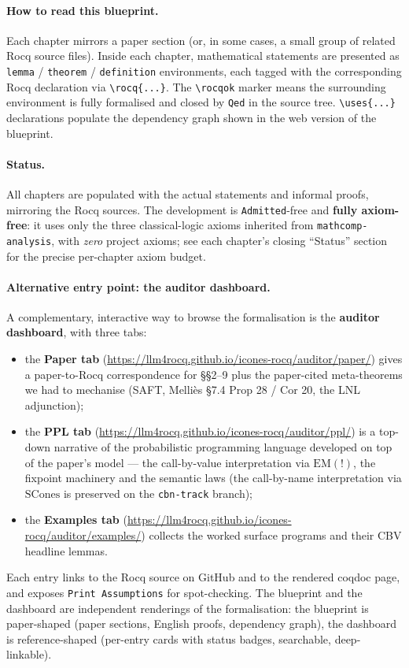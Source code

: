 \paragraph{How to read this blueprint.}
Each chapter mirrors a paper section (or, in some cases, a small
group of related Rocq source files). Inside each chapter, mathematical
statements are presented as \texttt{lemma} / \texttt{theorem} /
\texttt{definition} environments, each tagged with the corresponding
Rocq declaration via \verb|\rocq{...}|. The \verb|\rocqok| marker
means the surrounding environment is fully formalised and closed by
\verb|Qed| in the source tree. \verb|\uses{...}| declarations
populate the dependency graph shown in the web version of the
blueprint.

\paragraph{Status.}
All chapters are populated with the actual statements and informal
proofs, mirroring the Rocq sources. The development is
\texttt{Admitted}-free and \textbf{fully axiom-free}: it uses only the
three classical-logic axioms inherited from \texttt{mathcomp-analysis},
with \emph{zero} project axioms; see each chapter's closing ``Status''
section for the precise per-chapter axiom budget.

\paragraph{Alternative entry point: the auditor dashboard.}
A complementary, interactive way to browse the formalisation is the
\textbf{auditor dashboard}, with three tabs:
\begin{itemize}
    \item the \textbf{Paper tab}
    (\url{https://llm4rocq.github.io/icones-rocq/auditor/paper/}) gives
    a paper-to-Rocq correspondence for \S\S2--9 plus the paper-cited
    meta-theorems we had to mechanise (SAFT, Melli\`es \S7.4 Prop 28 /
    Cor 20, the LNL adjunction);
    \item the \textbf{PPL tab}
    (\url{https://llm4rocq.github.io/icones-rocq/auditor/ppl/}) is a
    top-down narrative of the probabilistic programming language
    developed on top of the paper's model --- the call-by-value
    interpretation via $\mathrm{EM}(\mathord{!})$, the fixpoint
    machinery and the semantic laws (the call-by-name interpretation via
    $\mathrm{SCones}$ is preserved on the \texttt{cbn-track} branch);
    \item the \textbf{Examples tab}
    (\url{https://llm4rocq.github.io/icones-rocq/auditor/examples/})
    collects the worked surface programs and their CBV headline lemmas.
\end{itemize}
Each entry links to the Rocq source on GitHub and to the rendered
coqdoc page, and exposes \texttt{Print Assumptions} for spot-checking.
The blueprint and the dashboard are independent renderings of the
formalisation: the blueprint is paper-shaped (paper sections, English
proofs, dependency graph), the dashboard is reference-shaped
(per-entry cards with status badges, searchable, deep-linkable).

